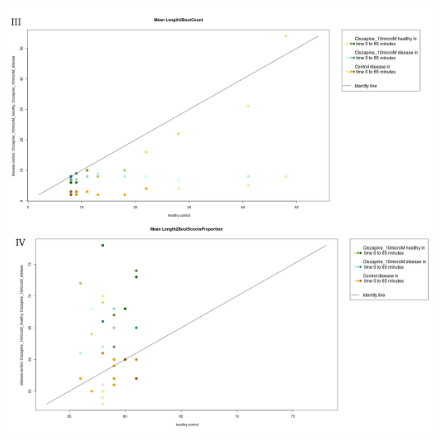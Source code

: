\documentclass[a4paper,12pt]{article}
\begin{document}
\begin{figure}[h!]
\begin{center}
\includegraphics[width=15cm,height=16cm]{ApoLowCountScootsC.png}
\end{center}
\end{figure}
\newpage
\end{document}
